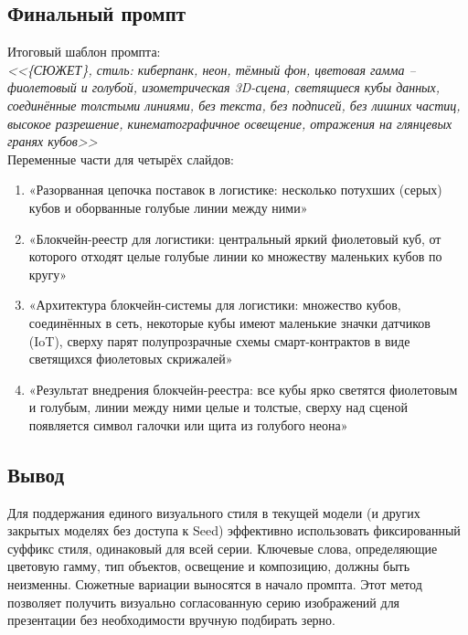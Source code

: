 \subsection{Финальный промпт}
Итоговый шаблон промпта: \\
\textit{<<\{СЮЖЕТ\}, стиль: киберпанк, неон, тёмный фон, цветовая гамма – фиолетовый и голубой, изометрическая 3D-сцена, светящиеся кубы данных, соединённые толстыми линиями, без текста, без подписей, без лишних частиц, высокое разрешение, кинематографичное освещение, отражения на глянцевых гранях кубов>>} \\
\newline
Переменные части для четырёх слайдов:
\begin{enumerate}
	\item «Разорванная цепочка поставок в логистике: несколько потухших (серых) кубов и оборванные голубые линии между ними»
	\item «Блокчейн-реестр для логистики: центральный яркий фиолетовый куб, от которого отходят целые голубые линии ко множеству маленьких кубов по кругу»
	\item «Архитектура блокчейн-системы для логистики: множество кубов, соединённых в сеть, некоторые кубы имеют маленькие значки датчиков (IoT), сверху парят полупрозрачные схемы смарт-контрактов в виде светящихся фиолетовых скрижалей»
	\item «Результат внедрения блокчейн-реестра: все кубы ярко светятся фиолетовым и голубым, линии между ними целые и толстые, сверху над сценой появляется символ галочки или щита из голубого неона»
\end{enumerate}
\subsection{Вывод}
Для поддержания единого визуального стиля в текущей модели (и других закрытых моделях без доступа к Seed) эффективно использовать фиксированный суффикс стиля, одинаковый для всей серии. Ключевые слова, определяющие цветовую гамму, тип объектов, освещение и композицию, должны быть неизменны. Сюжетные вариации выносятся в начало промпта. Этот метод позволяет получить визуально согласованную серию изображений для презентации без необходимости вручную подбирать зерно.